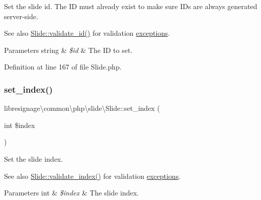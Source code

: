 Set the slide id. The ID must already exist to make sure I\+Ds are always generated server-\/side.

\begin{DoxySeeAlso}{See also}
\hyperlink{classlibresignage_1_1common_1_1php_1_1slide_1_1Slide_a060058082585b1ed9b7226f01ad376cc}{Slide\+::validate\+\_\+id()} for validation \hyperlink{namespacelibresignage_1_1common_1_1php_1_1slide_1_1exceptions}{exceptions}.
\end{DoxySeeAlso}

\begin{DoxyParams}[1]{Parameters}
string & {\em \$id} & The ID to set. \\
\hline
\end{DoxyParams}


Definition at line 167 of file Slide.\+php.

\mbox{\label{classlibresignage_1_1common_1_1php_1_1slide_1_1Slide_af2d0394d707a7afaac709c7bf457f324}} 
\subsubsection{\texorpdfstring{set\+\_\+index()}{set\_index()}}
{\footnotesize\ttfamily libresignage\textbackslash{}common\textbackslash{}php\textbackslash{}slide\textbackslash{}\+Slide\+::set\+\_\+index (\begin{DoxyParamCaption}\item[{int}]{\$index }\end{DoxyParamCaption})}

Set the slide index.

\begin{DoxySeeAlso}{See also}
\hyperlink{classlibresignage_1_1common_1_1php_1_1slide_1_1Slide_a77792fc7026c05a530644dddf5eadc45}{Slide\+::validate\+\_\+index()} for validation \hyperlink{namespacelibresignage_1_1common_1_1php_1_1slide_1_1exceptions}{exceptions}.
\end{DoxySeeAlso}

\begin{DoxyParams}[1]{Parameters}
int & {\em \$index} & The slide index. \\
\hline
\end{DoxyParams}


